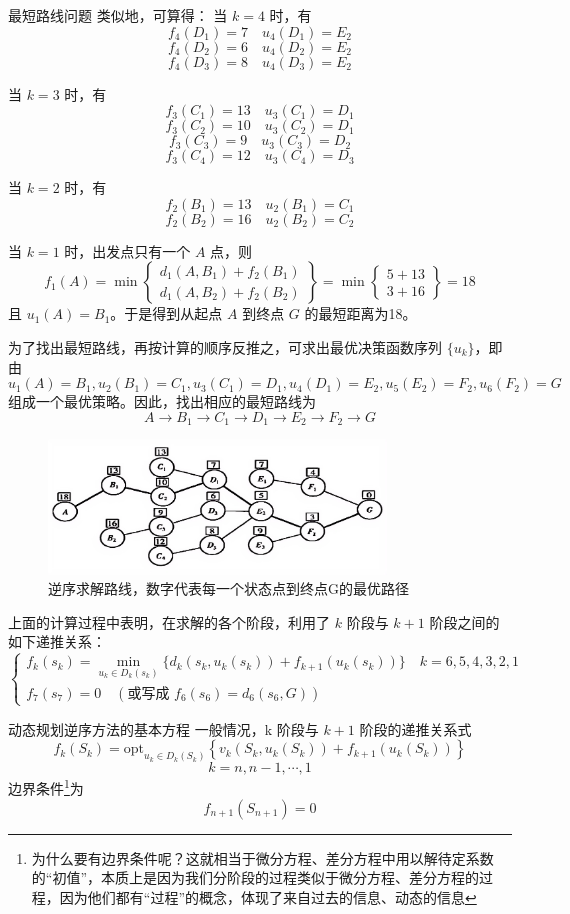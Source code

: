\begin{exbox}{最短路线问题}{}
		类似地，可算得：  
		当 \( k = 4 \) 时，有  
		\[f_4(D_1) = 7 \quad u_4(D_1) = E_2\]  
		\[f_4(D_2) = 6 \quad u_4(D_2) = E_2\]  
		\[f_4(D_3) = 8 \quad u_4(D_3) = E_2\]  
		
		当 \( k = 3 \) 时，有  
		\[f_3(C_1) = 13 \quad u_3(C_1) = D_1\]  
		\[f_3(C_2) = 10 \quad u_3(C_2) = D_1\]  
		\[f_3(C_3) = 9 \quad u_3(C_3) = D_2\]  
		\[f_3(C_4) = 12 \quad u_3(C_4) = D_3\]
		
		当 \( k = 2 \) 时，有
		\[f_2(B_1) = 13 \quad u_2(B_1) = C_1\]
		\[f_2(B_2) = 16 \quad u_2(B_2) = C_2\]
		
		当 \( k = 1 \) 时，出发点只有一个 \( A \) 点，则
		\[f_1(A) = \min \left\{ 
		\begin{array}{l}
		d_1(A, B_1) + f_2(B_1) \\
		d_1(A, B_2) + f_2(B_2)
		\end{array} 
		\right\} = \min \left\{ 
		\begin{array}{l}
		5 + 13 \\
		3 + 16
		\end{array} 
		\right\} = 18\]
		且 \( u_1(A) = B_1 \)。于是得到从起点 \( A \) 到终点 \( G \) 的最短距离为18。
		
		为了找出最短路线，再按计算的顺序反推之，可求出最优决策函数序列 \(\{u_k\}\)，即由  
		\[ u_1(A) = B_1, u_2(B_1) = C_1, u_3(C_1) = D_1, u_4(D_1) = E_2, u_5(E_2) = F_2, u_6(F_2) = G \]  
		组成一个最优策略。因此，找出相应的最短路线为  
		\[ A \rightarrow B_1 \rightarrow C_1 \rightarrow D_1 \rightarrow E_2 \rightarrow F_2 \rightarrow G \]
		\begin{figure}[H]
			\centering
			\includegraphics[width=0.8\textwidth]{./image/31.png}
			\caption{逆序求解路线，数字代表每一个状态点到终点G的最优路径}
			\label{fig:Chapter4_Temporary_Pavilion_1}
		\end{figure}
\end{exbox}
上面的计算过程中表明，在求解的各个阶段，利用了 \( k \) 阶段与 \( k+1 \) 阶段之间的如下递推关系：
		\[\begin{cases} 
		f_k(s_k) = \min_{u_k \in D_k(s_k)} \{ d_k(s_k, u_k(s_k)) + f_{k+1}(u_k(s_k)) \} \quad k = 6, 5, 4, 3, 2, 1 \\ 
		f_7(s_7) = 0 \quad (\text{或写成 } f_6(s_6) = d_6(s_6, G))
		\end{cases}\]
	\begin{thmbox}{动态规划逆序方法的基本方程}{}
		一般情况，k 阶段与 \( k+1 \) 阶段的递推关系式
		\[f_k(S_k) = \text{opt}_{u_k \in D_k(S_k)} \left\{ v_k(S_k, u_k(S_k)) + f_{k+1}(u_k(S_k)) \right\}\]
		\[k = n, n-1, \cdots, 1\]
		边界条件\footnote{为什么要有边界条件呢？这就相当于微分方程、差分方程中用以解待定系数的“初值”，本质上是因为我们分阶段的过程类似于微分方程、差分方程的过程，因为他们都有“过程”的概念，体现了来自过去的信息、动态的信息}为
		\[f_{n+1}(S_{n+1}) = 0\]
	\end{thmbox}
